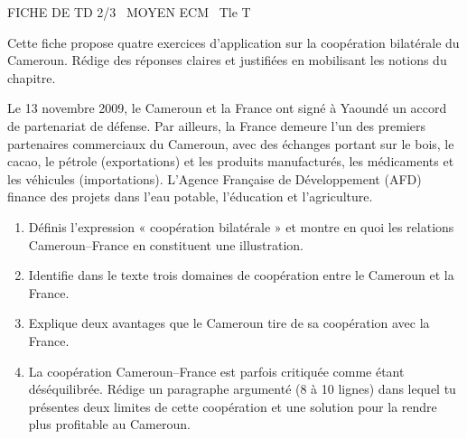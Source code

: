 \documentclass[11pt]{article}
\begin{document}
\begin{tcolorbox}[enhanced,colback=popink,colframe=popink,arc=10pt,boxrule=0pt,left=12pt,right=12pt,top=9pt,bottom=9pt]
{\color{white}\popxbold\small FICHE DE TD 2/3 \textbullet\ MOYEN \hfill ECM \textbullet\ Tle T\par}
\end{tcolorbox}
\vspace{4pt}
Cette fiche propose quatre exercices d'application sur la coopération bilatérale du Cameroun. Rédige des réponses claires et justifiées en mobilisant les notions du chapitre.

\begin{exercice}
Le 13 novembre 2009, le Cameroun et la France ont signé à Yaoundé un accord de partenariat de défense. Par ailleurs, la France demeure l'un des premiers partenaires commerciaux du Cameroun, avec des échanges portant sur le bois, le cacao, le pétrole (exportations) et les produits manufacturés, les médicaments et les véhicules (importations). L'Agence Française de Développement (AFD) finance des projets dans l'eau potable, l'éducation et l'agriculture.
\begin{enumerate}
\item Définis l'expression « coopération bilatérale » et montre en quoi les relations Cameroun--France en constituent une illustration.
\item Identifie dans le texte trois domaines de coopération entre le Cameroun et la France.
\item Explique deux avantages que le Cameroun tire de sa coopération avec la France.
\item La coopération Cameroun--France est parfois critiquée comme étant déséquilibrée. Rédige un paragraphe argumenté (8 à 10 lignes) dans lequel tu présentes deux limites de cette coopération et une solution pour la rendre plus profitable au Cameroun.
\end{enumerate}
\end{exercice}
\end{document}

